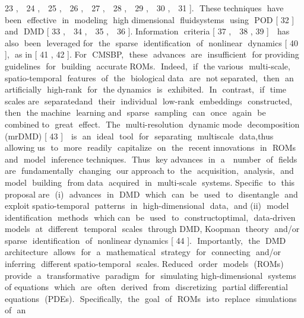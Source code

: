 \documentclass{article}
\begin{document}
23​ , ​ ​ 24​ , ​ ​ 25​ , ​ ​ 26​ , ​ ​ 27​ , ​ ​ 28​ , ​ ​ 29​ , ​ ​ 30​ , ​ ​ 31​ ].​ ​ These​ ​ techniques​ ​ have​ ​ been​ ​ effective​ ​ in​ ​ modeling​ ​ high
dimensional​ ​ fluid​ ​ systems​ ​ using​ ​ POD [​ 32​ ] ​ ​ and​ ​ DMD [​ 33​ , ​ ​ 34​ , ​ ​ 35​ , ​ ​ 36​ ].​ ​ Information​ ​ criteria [​ 37​ , ​ ​ 38​ ,
39​ ] ​ ​ has​ ​ also​ ​ been​ ​ leveraged​ ​ for​ ​ the​ ​ sparse​ ​ identification​ ​ of​ ​ nonlinear​ ​ dynamics [​ 40​ ],​ ​ as​ ​ in [​ 41​ ,
42​ ].
For​ ​ CMSBP,​ ​ these​ ​ advances​ ​ are​ ​ insufficient​ ​ for​ ​ providing​ ​ guidelines​ ​ for​ ​ building​ ​ accurate
ROMs.​ ​ Indeed,​ ​ if​ ​ the​ ​ various​ ​ multi-scale,​ ​ spatio-temporal​ ​ features​ ​ of​ ​ the​ ​ biological​ ​ data​ ​ are​ ​ not
separated,​ ​ then​ ​ an​ ​ artificially​ ​ high-rank​ ​ for​ ​ the​ ​ dynamics​ ​ is​ ​ exhibited.​ ​ In​ ​ contrast,​ ​ if​ ​ time​ ​ scales
are​ ​ separated​ ​ and​ ​ their​ ​ individual​ ​ low-rank​ ​ embeddings​ ​ constructed,​ ​ then​ ​ the​ ​ machine​ ​ learning
and​ ​ sparse​ ​ sampling​ ​ can​ ​ once​ ​ again​ ​ be​ ​ combined​ ​ to​ ​ great​ ​ effect.​ ​ The​ ​ multi-resolution​ ​ dynamic
mode​ ​ decomposition​ ​ (mrDMD) [​ 43​ ] ​ ​ is​ ​ an​ ​ ideal​ ​ tool​ ​ for​ ​ separating​ ​ multiscale​ ​ data,​ ​ thus​ ​ allowing
us​ ​ to​ ​ more​ ​ readily​ ​ capitalize​ ​ on​ ​ the​ ​ recent​ ​ innovations​ ​ in​ ​ ROMs​ ​ and​ ​ model​ ​ inference
techniques.​ ​ Thus​ ​ key​ ​ advances​ ​ in​ ​ a ​ ​ number​ ​ of​ ​ fields​ ​ are​ ​ fundamentally​ ​ changing​ ​ our​ ​ approach
to​ ​ the​ ​ acquisition,​ ​ analysis,​ ​ and​ ​ model​ ​ building​ ​ from​ ​ data​ ​ acquired​ ​ in​ ​ multi-scale​ ​ systems.
Specific​ ​ to​ ​ this​ ​ proposal​ ​ are​ ​ (i)​ ​ advances​ ​ in​ ​ DMD​ ​ which​ ​ can​ ​ be​ ​ used​ ​ to​ ​ disentangle​ ​ and​ ​ exploit
spatio-temporal​ ​ patterns​ ​ in​ ​ high-dimensional​ ​ data,​ ​ and​ ​ (ii)​ ​ model​ ​ identification​ ​ methods​ ​ which
can​ ​ be​ ​ used​ ​ to​ ​ construct​ ​ optimal,​ ​ data-driven​ ​ models​ ​ at​ ​ different​ ​ temporal​ ​ scales​ ​ through​ ​ DMD,
Koopman​ ​ theory​ ​ and/or​ ​ sparse​ ​ identification​ ​ of​ ​ nonlinear​ ​ dynamics [​ 44​ ].​ ​ Importantly,​ ​ the​ ​ DMD
architecture​ ​ allows​ ​ for​ ​ a ​ ​ mathematical​ ​ strategy​ ​ for​ ​ connecting​ ​ and/or​ ​ inferring​ ​ different
spatio-temporal​ ​ scales.
Reduced​ ​ order​ ​ models​ ​ (ROMs)​ ​ provide​ ​ a ​ ​ transformative​ ​ paradigm​ ​ for​ ​ simulating
high-dimensional​ ​ systems​ ​ of​ ​ equations​ ​ which​ ​ are​ ​ often​ ​ derived​ ​ from​ ​ discretizing​ ​ partial
differential​ ​ equations​ ​ (PDEs).​ ​ Specifically,​ ​ the​ ​ goal​ ​ of​ ​ ROMs​ ​ is​ ​ to​ ​ replace​ ​ simulations​ ​ of​ ​ an
\end{document}
